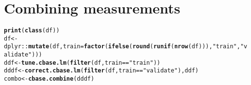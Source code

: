 \documentclass[10pt,notes=all,aspectratio=1610]{beamer}\usepackage[]{graphicx}\usepackage[]{color}
\makeatletter
\newcommand{\hlstr}[1]{\textcolor[rgb]{0.192,0.494,0.8}{#1}}%
\newcommand{\hlopt}[1]{\textcolor[rgb]{0,0,0}{#1}}%
\newcommand{\hlstd}[1]{\textcolor[rgb]{0.345,0.345,0.345}{#1}}%
\newcommand{\hlkwb}[1]{\textcolor[rgb]{0.69,0.353,0.396}{#1}}%
\newcommand{\hlkwc}[1]{\textcolor[rgb]{0.333,0.667,0.333}{#1}}%
\newcommand{\hlkwd}[1]{\textcolor[rgb]{0.737,0.353,0.396}{\textbf{#1}}}%
\newenvironment{kframe}{%
 \def\at@end@of@kframe{}%
 \ifinner\ifhmode%
  \def\at@end@of@kframe{\end{minipage}}%
  \begin{minipage}{\columnwidth}%
 \fi\fi%
 \def\FrameCommand##1{\hskip\@totalleftmargin \hskip-\fboxsep
 \colorbox{shadecolor}{##1}\hskip-\fboxsep
     \hskip-\linewidth \hskip-\@totalleftmargin \hskip\columnwidth}%
 \MakeFramed {\advance\hsize-\width
   \@totalleftmargin\z@ \linewidth\hsize
   \@setminipage}}%
 {\par\unskip\endMakeFramed%
 \at@end@of@kframe}
\newenvironment{knitrout}{}{} %
\makeatother
\begin{document}

\section{Combining measurements}
\label{sec:combo}
\begin{knitrout}
\color{fgcolor}\begin{kframe}
\begin{alltt}
\hlkwd{print}\hlstd{(}\hlkwd{class}\hlstd{(df))}
\hlstd{df} \hlkwb{<-} \hlstd{dplyr}\hlopt{::}\hlkwd{mutate}\hlstd{(df,} \hlkwc{train} \hlstd{=} \hlkwd{factor}\hlstd{(}\hlkwd{ifelse}\hlstd{(}\hlkwd{round}\hlstd{(}\hlkwd{runif}\hlstd{(}\hlkwd{nrow}\hlstd{(df))),} \hlstr{"train"}\hlstd{,} \hlstr{"validate"}\hlstd{)))}
\hlstd{ddf} \hlkwb{<-} \hlkwd{tune.cbase.lm}\hlstd{(}\hlkwd{filter}\hlstd{(df, train} \hlopt{==} \hlstr{"train"}\hlstd{))}
\hlstd{dddf} \hlkwb{<-} \hlkwd{correct.cbase.lm}\hlstd{(}\hlkwd{filter}\hlstd{(df, train} \hlopt{==} \hlstr{"validate"}\hlstd{), ddf)}
\hlstd{combo} \hlkwb{<-} \hlkwd{cbase.combine}\hlstd{(dddf)}
\end{alltt}
\end{kframe}
\end{knitrout}
\end{document}
